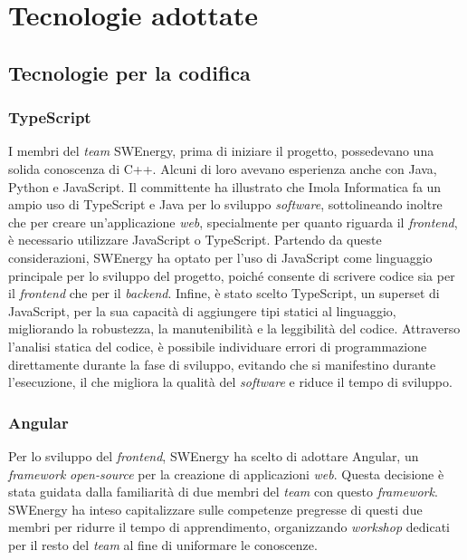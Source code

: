 \section{Tecnologie adottate}

\subsection{Tecnologie per la codifica}

\subsubsection{TypeScript}
I membri del \textit{team} SWEnergy, prima di iniziare il progetto, possedevano una
solida conoscenza di C++. Alcuni di loro avevano esperienza anche con Java,
Python e JavaScript. Il committente ha illustrato che Imola Informatica fa un
ampio uso di TypeScript e Java per lo sviluppo \textit{software}, sottolineando
inoltre che per creare un'applicazione \textit{web}, specialmente per quanto riguarda il
\textit{frontend}, è necessario utilizzare JavaScript o TypeScript. Partendo da
queste considerazioni, SWEnergy ha optato per l'uso di JavaScript come
linguaggio principale per lo sviluppo del progetto, poiché consente di scrivere
codice sia per il \textit{frontend} che per il \textit{backend}. Infine, è stato
scelto TypeScript, un superset di JavaScript, per la sua capacità di aggiungere
tipi statici al linguaggio, migliorando la robustezza, la manutenibilità e la
leggibilità del codice. Attraverso l'analisi statica del codice, è possibile
individuare errori di programmazione direttamente durante la fase di sviluppo,
evitando che si manifestino durante l'esecuzione, il che migliora la qualità del
\textit{software} e riduce il tempo di sviluppo.


\subsubsection{Angular}
Per lo sviluppo del \textit{frontend}, SWEnergy ha scelto di adottare Angular,
un \textit{framework} \textit{open-source} per la creazione di applicazioni \textit{web}. Questa
decisione è stata guidata dalla familiarità di due membri del \textit{team} con questo
\textit{framework}. SWEnergy ha inteso capitalizzare sulle competenze pregresse
di questi due membri per ridurre il tempo di apprendimento, organizzando
\textit{workshop} dedicati per il resto del \textit{team} al fine di uniformare le
conoscenze.


